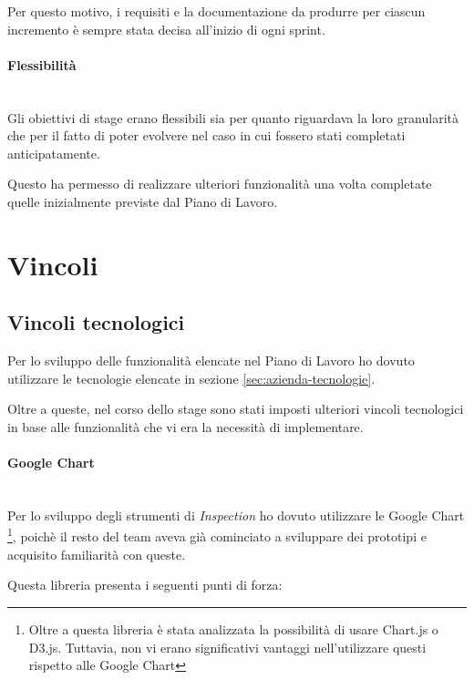 Per questo motivo, i requisiti e la documentazione da produrre per ciascun
incremento è sempre stata decisa all'inizio di ogni sprint.

\paragraph{Flessibilità} \mbox{} \\

Gli obiettivi di stage erano flessibili sia per quanto riguardava la loro
granularità che per il fatto di poter evolvere nel caso in cui fossero stati
completati anticipatamente.

Questo ha permesso di realizzare ulteriori funzionalità una volta completate
quelle inizialmente previste dal Piano di Lavoro.

\section{Vincoli}

\subsection{Vincoli tecnologici}

Per lo sviluppo delle funzionalità elencate nel Piano di Lavoro ho dovuto
utilizzare le tecnologie elencate in sezione \ref{sec:azienda-tecnologie}.

Oltre a queste, nel corso dello stage sono stati imposti ulteriori vincoli
tecnologici in base alle funzionalità che vi era la necessità di implementare.

\paragraph{Google Chart} \mbox{} \\

Per lo sviluppo degli strumenti di \emph{Inspection} ho dovuto utilizzare le
Google Chart \footnote{Oltre a questa libreria è stata analizzata
la possibilità di usare Chart.js o D3.js. Tuttavia, non vi erano significativi
vantaggi nell'utilizzare questi rispetto alle Google Chart },
poichè il resto del team aveva già cominciato a sviluppare dei prototipi e
acquisito familiarità con queste.

Questa libreria presenta i seguenti punti di forza:

